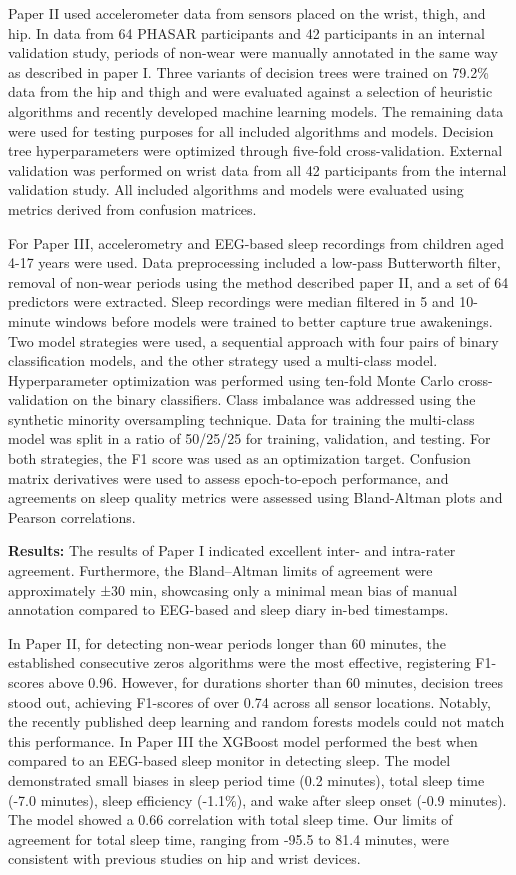 \documentclass[
  10pt,
]{scrbook}
\let\originaltextbf\textbf
\renewcommand{\textbf}[1]{\textcolor{color1}{\originaltextbf{#1}}}
\begin{document}
Paper II used accelerometer data from sensors placed on the wrist,
thigh, and hip. In data from 64 PHASAR participants and 42 participants
in an internal validation study, periods of non-wear were manually
annotated in the same way as described in paper I. Three variants of
decision trees were trained on 79.2\% data from the hip and thigh and
were evaluated against a selection of heuristic algorithms and recently
developed machine learning models. The remaining data were used for
testing purposes for all included algorithms and models. Decision tree
hyperparameters were optimized through five-fold cross-validation.
External validation was performed on wrist data from all 42 participants
from the internal validation study. All included algorithms and models
were evaluated using metrics derived from confusion matrices.

For Paper III, accelerometry and EEG-based sleep recordings from
children aged 4-17 years were used. Data preprocessing included a
low-pass Butterworth filter, removal of non-wear periods using the
method described paper II, and a set of 64 predictors were extracted.
Sleep recordings were median filtered in 5 and 10-minute windows before
models were trained to better capture true awakenings. Two model
strategies were used, a sequential approach with four pairs of binary
classification models, and the other strategy used a multi-class model.
Hyperparameter optimization was performed using ten-fold Monte Carlo
cross-validation on the binary classifiers. Class imbalance was
addressed using the synthetic minority oversampling technique. Data for
training the multi-class model was split in a ratio of 50/25/25 for
training, validation, and testing. For both strategies, the F1 score was
used as an optimization target. Confusion matrix derivatives were used
to assess epoch-to-epoch performance, and agreements on sleep quality
metrics were assessed using Bland-Altman plots and Pearson correlations.

\textbf{Results:} The results of Paper I indicated excellent inter- and
intra-rater agreement. Furthermore, the Bland--Altman limits of
agreement were approximately ±30 min, showcasing only a minimal mean
bias of manual annotation compared to EEG-based and sleep diary in-bed
timestamps.

In Paper II, for detecting non-wear periods longer than 60 minutes, the
established consecutive zeros algorithms were the most effective,
registering F1-scores above 0.96. However, for durations shorter than 60
minutes, decision trees stood out, achieving F1-scores of over 0.74
across all sensor locations. Notably, the recently published deep
learning and random forests models could not match this performance. In
Paper III the XGBoost model performed the best when compared to an
EEG-based sleep monitor in detecting sleep. The model demonstrated small
biases in sleep period time (0.2 minutes), total sleep time (-7.0
minutes), sleep efficiency (-1.1\%), and wake after sleep onset (-0.9
minutes). The model showed a 0.66 correlation with total sleep time. Our
limits of agreement for total sleep time, ranging from -95.5 to 81.4
minutes, were consistent with previous studies on hip and wrist devices.
\end{document}
